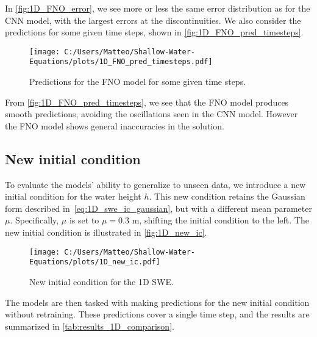In \autoref{fig:1D_FNO_error}, we see more or less the same error distribution as for the CNN model, with the largest errors at the discontinuities.
We also consider the predictions for some given time steps, shown in \autoref{fig:1D_FNO_pred_timesteps}.
\begin{figure}[H]
    \centering
    \texttt{[image: C:/Users/Matteo/Shallow-Water-Equations/plots/1D\_FNO\_pred\_timesteps.pdf]}
    \caption{Predictions for the FNO model for some given time steps.}\label{fig:1D_FNO_pred_timesteps}
\end{figure}
From \autoref{fig:1D_FNO_pred_timesteps}, we see that the FNO model produces smooth predictions, avoiding the oscillations seen in the CNN model.
However the FNO model shows general inaccuracies in the solution.

\subsection*{New initial condition}
To evaluate the models' ability to generalize to unseen data, we introduce a new initial condition for the water height $h$.
This new condition retains the Gaussian form described in~\eqref{eq:1D_swe_ic_gaussian}, but with a different mean parameter $\mu$.
Specifically, $\mu$ is set to $\mu = 0.3$ m, shifting the initial condition to the left.
The new initial condition is illustrated in \autoref{fig:1D_new_ic}.
\begin{figure}[H]
    \centering
    \texttt{[image: C:/Users/Matteo/Shallow-Water-Equations/plots/1D\_new\_ic.pdf]}
    \caption{New initial condition for the 1D SWE.}\label{fig:1D_new_ic}
\end{figure}
The models are then tasked with making predictions for the new initial condition without retraining.
These predictions cover a single time step, and the results are summarized in \autoref{tab:results_1D_comparison}.

